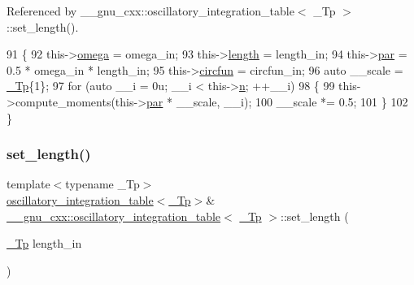 Referenced by \+\_\+\+\_\+gnu\+\_\+cxx\+::oscillatory\+\_\+integration\+\_\+table$<$ \+\_\+\+Tp $>$\+::set\+\_\+length().


\begin{DoxyCode}
91       \{
92         this->\hyperlink{struct____gnu__cxx_1_1oscillatory__integration__table_a722a28c43e85cce33bbe6337e6a5c9eb}{omega} = omega\_in;
93         this->\hyperlink{struct____gnu__cxx_1_1oscillatory__integration__table_ad8654aa233b4878af8d9a99ed61db488}{length} = length\_in;
94         this->\hyperlink{struct____gnu__cxx_1_1oscillatory__integration__table_ae98255b8cccea27dde0047c45cfc2ac6}{par} = 0.5 * omega\_in * length\_in;
95         this->\hyperlink{struct____gnu__cxx_1_1oscillatory__integration__table_a21f86f96ca3654c18fa987f15bc14eaf}{circfun} = circfun\_in;
96         \textcolor{keyword}{auto} \_\_scale = \hyperlink{namespace____gnu__cxx_a3b19a9c800ca194374ef9172290f7d79}{\_Tp}\{1\};
97         \textcolor{keywordflow}{for} (\textcolor{keyword}{auto} \_\_i = 0u; \_\_i < this->\hyperlink{struct____gnu__cxx_1_1oscillatory__integration__table_a7afb6e15c7cf51c48ed89fc2d8450179}{n}; ++\_\_i)
98           \{
99             this->compute\_moments(this->\hyperlink{struct____gnu__cxx_1_1oscillatory__integration__table_ae98255b8cccea27dde0047c45cfc2ac6}{par} * \_\_scale, \_\_i);
100             \_\_scale *= 0.5;
101           \}
102       \}
\end{DoxyCode}
\mbox{\label{struct____gnu__cxx_1_1oscillatory__integration__table_a086da28f8232d48ed2a3257eba2aec4c}} 
\subsubsection{\texorpdfstring{set\+\_\+length()}{set\_length()}}
{\footnotesize\ttfamily template$<$typename \+\_\+\+Tp$>$ \\
\hyperlink{struct____gnu__cxx_1_1oscillatory__integration__table}{oscillatory\+\_\+integration\+\_\+table}$<$\hyperlink{namespace____gnu__cxx_a3b19a9c800ca194374ef9172290f7d79}{\+\_\+\+Tp}$>$\& \hyperlink{struct____gnu__cxx_1_1oscillatory__integration__table}{\+\_\+\+\_\+gnu\+\_\+cxx\+::oscillatory\+\_\+integration\+\_\+table}$<$ \hyperlink{namespace____gnu__cxx_a3b19a9c800ca194374ef9172290f7d79}{\+\_\+\+Tp} $>$\+::set\+\_\+length (\begin{DoxyParamCaption}\item[{\hyperlink{namespace____gnu__cxx_a3b19a9c800ca194374ef9172290f7d79}{\+\_\+\+Tp}}]{length\+\_\+in }\end{DoxyParamCaption})\hspace{0.3cm}{\ttfamily [inline]}}



